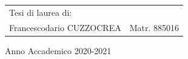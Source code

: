 \begin{titlepage}
\begin{flushright}
\begin{tabular}{ll}
Tesi di laurea di: & \tabularnewline
Francescodario CUZZOCREA & Matr. 885016\tabularnewline
\end{tabular}\vspace{2.5cm}
\par\end{flushright}

\begin{center}
{\large{}Anno Accademico 2020-2021}{\large\par}
\par\end{center}

\end{titlepage}
